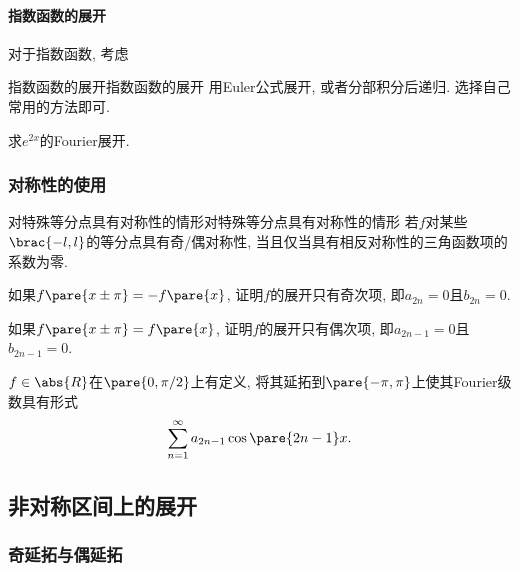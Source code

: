 \documentclass[hidelinks]{ctexart}
\begin{document}

\paragraph{指数函数的展开} %
\label{par:指数函数的展开}

对于指数函数, 考虑
\begin{reflex}{指数函数的展开}{指数函数的展开}
    用Euler公式展开, 或者分部积分后递归. 选择自己常用的方法即可.
\end{reflex}
\begin{ex}
    求$e^{2x}$的Fourier展开.
\end{ex}



\subsubsection{对称性的使用} %
\label{ssub:对称性的使用}

\begin{reflex}{对特殊等分点具有对称性的情形}{对特殊等分点具有对称性的情形}
    若$f$对某些$\brac{-l,l}$的等分点具有奇/偶对称性, 当且仅当具有相反对称性的三角函数项的系数为零.
\end{reflex}
\begin{ex}
    如果$f\pare{x\pm\pi}=-f\pare{x}$, 证明$f$的展开只有奇次项, 即$a_{2n}=0$且$b_{2n}=0$.
\end{ex}
\begin{ex}
    如果$f\pare{x\pm\pi}=f\pare{x}$, 证明$f$的展开只有偶次项, 即$a_{2n-1}=0$且$b_{2n-1}=0$.
\end{ex}
\begin{ex}
    $f\in \abs{R}$在$\pare{0,\pi/2}$上有定义, 将其延拓到$\pare{-\pi,\pi}$上使其Fourier级数具有形式
    \[ \sum_{n=1}^\infty a_{2n-1}\cos\pare{2n-1}x. \]
\end{ex}



\subsection{非对称区间上的展开} %
\label{sub:非对称区间上的展开}

\subsubsection{奇延拓与偶延拓} %
\label{ssub:奇延拓与偶延拓}
\end{document}
